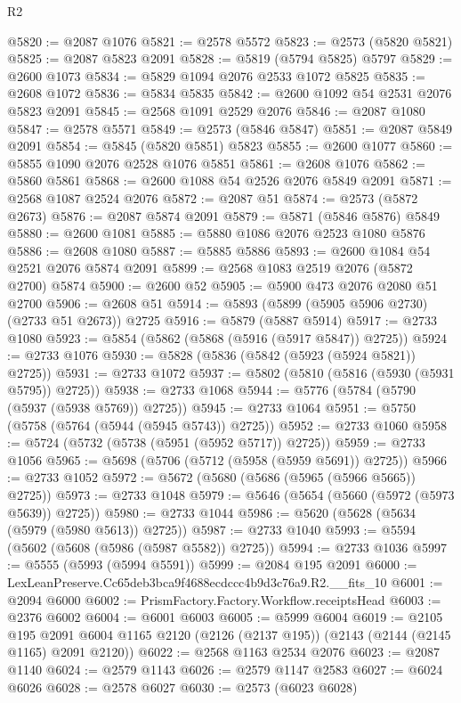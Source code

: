 \begin{lexlean}{R2}
\begin{coremodule}
@5820 := @2087 @1076
@5821 := @2578 @5572
@5823 := @2573 (@5820 @5821)
@5825 := @2087 @5823 @2091
@5828 := @5819 (@5794 @5825) @5797
@5829 := @2600 @1073
@5834 := @5829 @1094 @2076 @2533 @1072 @5825
@5835 := @2608 @1072
@5836 := @5834 @5835
@5842 := @2600 @1092 @54 @2531 @2076 @5823 @2091
@5845 := @2568 @1091 @2529 @2076
@5846 := @2087 @1080
@5847 := @2578 @5571
@5849 := @2573 (@5846 @5847)
@5851 := @2087 @5849 @2091
@5854 := @5845 (@5820 @5851) @5823
@5855 := @2600 @1077
@5860 := @5855 @1090 @2076 @2528 @1076 @5851
@5861 := @2608 @1076
@5862 := @5860 @5861
@5868 := @2600 @1088 @54 @2526 @2076 @5849 @2091
@5871 := @2568 @1087 @2524 @2076
@5872 := @2087 @51
@5874 := @2573 (@5872 @2673)
@5876 := @2087 @5874 @2091
@5879 := @5871 (@5846 @5876) @5849
@5880 := @2600 @1081
@5885 := @5880 @1086 @2076 @2523 @1080 @5876
@5886 := @2608 @1080
@5887 := @5885 @5886
@5893 := @2600 @1084 @54 @2521 @2076 @5874 @2091
@5899 := @2568 @1083 @2519 @2076 (@5872 @2700) @5874
@5900 := @2600 @52
@5905 := @5900 @473 @2076 @2080 @51 @2700
@5906 := @2608 @51
@5914 := @5893 (@5899 (@5905 @5906 @2730) (@2733 @51 @2673)) @2725
@5916 := @5879 (@5887 @5914)
@5917 := @2733 @1080
@5923 := @5854 (@5862 (@5868 (@5916 (@5917 @5847)) @2725))
@5924 := @2733 @1076
@5930 := @5828 (@5836 (@5842 (@5923 (@5924 @5821)) @2725))
@5931 := @2733 @1072
@5937 := @5802 (@5810 (@5816 (@5930 (@5931 @5795)) @2725))
@5938 := @2733 @1068
@5944 := @5776 (@5784 (@5790 (@5937 (@5938 @5769)) @2725))
@5945 := @2733 @1064
@5951 := @5750 (@5758 (@5764 (@5944 (@5945 @5743)) @2725))
@5952 := @2733 @1060
@5958 := @5724 (@5732 (@5738 (@5951 (@5952 @5717)) @2725))
@5959 := @2733 @1056
@5965 := @5698 (@5706 (@5712 (@5958 (@5959 @5691)) @2725))
@5966 := @2733 @1052
@5972 := @5672 (@5680 (@5686 (@5965 (@5966 @5665)) @2725))
@5973 := @2733 @1048
@5979 := @5646 (@5654 (@5660 (@5972 (@5973 @5639)) @2725))
@5980 := @2733 @1044
@5986 := @5620 (@5628 (@5634 (@5979 (@5980 @5613)) @2725))
@5987 := @2733 @1040
@5993 := @5594 (@5602 (@5608 (@5986 (@5987 @5582)) @2725))
@5994 := @2733 @1036
@5997 := @5555 (@5993 (@5994 @5591))
@5999 := @2084 @195 @2091
@6000 := LexLeanPreserve.Cc65deb3bca9f4688ecdccc4b9d3c76a9.R2.__fits_10
@6001 := @2094 @6000
@6002 := PrismFactory.Factory.Workflow.receiptsHead
@6003 := @2376 @6002
@6004 := @6001 @6003
@6005 := @5999 @6004
@6019 := @2105
    @195
    @2091
    @6004
    @1165
    @2120
    (@2126 (@2137 @195))
    (@2143 (@2144 (@2145 @1165) @2091 @2120))
@6022 := @2568 @1163 @2534 @2076
@6023 := @2087 @1140
@6024 := @2579 @1143
@6026 := @2579 @1147 @2583
@6027 := @6024 @6026
@6028 := @2578 @6027
@6030 := @2573 (@6023 @6028)

\end{coremodule}
\end{lexlean}
